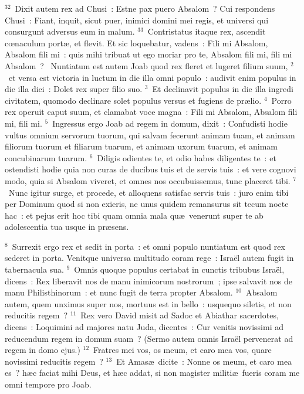 ${}^{32}$~Dixit autem rex ad Chusi~: Estne pax puero Absalom~? Cui respondens Chusi~: Fiant, inquit, sicut puer, inimici domini mei regis, et universi qui consurgunt adversus eum in malum.
${}^{33}$~Contristatus itaque rex, ascendit cœnaculum port\ae , et flevit. Et sic loquebatur, vadens~: Fili mi Absalom, Absalom fili mi~: quis mihi tribuat ut ego moriar pro te, Absalom fili mi, fili mi Absalom~?
~Nuntiatum est autem Joab quod rex fleret et lugeret filium suum,
${}^{2}$~et versa est victoria in luctum in die illa omni populo~: audivit enim populus in die illa dici~: Dolet rex super filio suo.
${}^{3}$~Et declinavit populus in die illa ingredi civitatem, quomodo declinare solet populus versus et fugiens de pr\ae lio.
${}^{4}$~Porro rex operuit caput suum, et clamabat voce magna~: Fili mi Absalom, Absalom fili mi, fili mi.
${}^{5}$~Ingressus ergo Joab ad regem in domum, dixit~: Confudisti hodie vultus omnium servorum tuorum, qui salvam fecerunt animam tuam, et animam filiorum tuorum et filiarum tuarum, et animam uxorum tuarum, et animam concubinarum tuarum.
${}^{6}$~Diligis odientes te, et odio habes diligentes te~: et ostendisti hodie quia non curas de ducibus tuis et de servis tuis~: et vere cognovi modo, quia si Absalom viveret, et omnes nos occubuissemus, tunc placeret tibi.
${}^{7}$~Nunc igitur surge, et procede, et alloquens satisfac servis tuis~: juro enim tibi per Dominum quod si non exieris, ne unus quidem remansurus sit tecum nocte hac~: et pejus erit hoc tibi quam omnia mala qu\ae\ venerunt super te ab adolescentia tua usque in pr\ae sens.


${}^{8}$~Surrexit ergo rex et sedit in porta~: et omni populo nuntiatum est quod rex sederet in porta. Venitque universa multitudo coram rege~: Isra\"el autem fugit in tabernacula sua.
${}^{9}$~Omnis quoque populus certabat in cunctis tribubus Isra\"el, dicens~: Rex liberavit nos de manu inimicorum nostrorum~; ipse salvavit nos de manu Philisthinorum~: et nunc fugit de terra propter Absalom.
${}^{10}$~Absalom autem, quem unximus super nos, mortuus est in bello~: usquequo siletis, et non reducitis regem~?
${}^{11}$~Rex vero David misit ad Sadoc et Abiathar sacerdotes, dicens~: Loquimini ad majores natu Juda, dicentes~: Cur venitis novissimi ad reducendum regem in domum suam~? (Sermo autem omnis Isra\"el pervenerat ad regem in domo ejus.)
${}^{12}$~Fratres mei vos, os meum, et caro mea vos, quare novissimi reducitis regem~?
${}^{13}$~Et Amas\ae\ dicite~: Nonne os meum, et caro mea es~? h\ae c faciat mihi Deus, et h\ae c addat, si non magister militi\ae\ fueris coram me omni tempore pro Joab.


